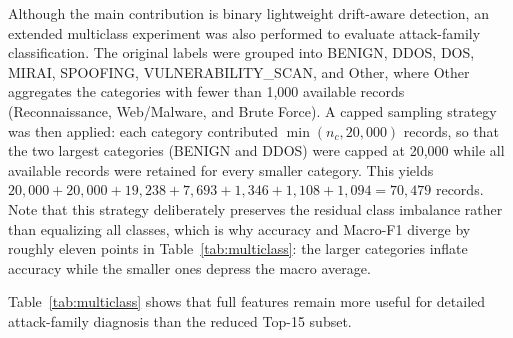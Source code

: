 \documentclass[11pt,a4paper]{article}
\begin{document}
Although the main contribution is binary lightweight drift-aware
detection, an extended multiclass experiment was also performed to
evaluate attack-family classification. The original labels were grouped
into BENIGN, DDOS, DOS, MIRAI, SPOOFING, VULNERABILITY\_SCAN, and Other,
where Other aggregates the categories with fewer than 1{,}000 available
records (Reconnaissance, Web/Malware, and Brute Force). A capped
sampling strategy was then applied: each category contributed
$\min(n_c, 20{,}000)$ records, so that the two largest categories
(BENIGN and DDOS) were capped at 20{,}000 while all available records
were retained for every smaller category. This yields
$20{,}000 + 20{,}000 + 19{,}238 + 7{,}693 + 1{,}346 + 1{,}108 + 1{,}094
= 70{,}479$ records. Note that this strategy deliberately preserves the
residual class imbalance rather than equalizing all classes, which is
why accuracy and Macro-F1 diverge by roughly eleven points in
Table~\ref{tab:multiclass}: the larger categories inflate accuracy while
the smaller ones depress the macro average.

Table~\ref{tab:multiclass} shows that full features remain more useful
for detailed attack-family diagnosis than the reduced Top-15 subset.

\begin{table}[!ht]
\centering
\caption{Extended multiclass attack category classification results.}
\label{tab:multiclass}
\small
{}
\end{table}
\end{document}
